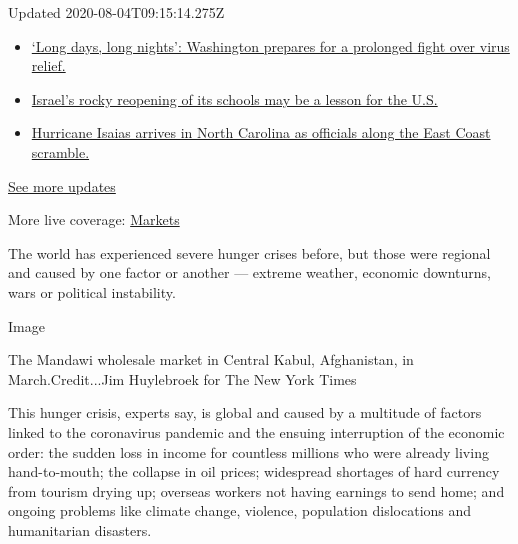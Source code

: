 Updated 2020-08-04T09:15:14.275Z

\begin{itemize}
\tightlist
\item
  \href{https://www.nytimes.com/2020/08/04/world/coronavirus-covid-19.html?action=click\&pgtype=Article\&state=default\&region=MAIN_CONTENT_1\&context=storylines_live_updates\#link-6b644638}{`Long
  days, long nights': Washington prepares for a prolonged fight over
  virus relief.}
\item
  \href{https://www.nytimes.com/2020/08/04/world/coronavirus-covid-19.html?action=click\&pgtype=Article\&state=default\&region=MAIN_CONTENT_1\&context=storylines_live_updates\#link-7af9fca0}{Israel's
  rocky reopening of its schools may be a lesson for the U.S.}
\item
  \href{https://www.nytimes.com/2020/08/04/world/coronavirus-covid-19.html?action=click\&pgtype=Article\&state=default\&region=MAIN_CONTENT_1\&context=storylines_live_updates\#link-33bf9168}{Hurricane
  Isaias arrives in North Carolina as officials along the East Coast
  scramble.}
\end{itemize}

\href{https://www.nytimes.com/2020/08/04/world/coronavirus-covid-19.html?action=click\&pgtype=Article\&state=default\&region=MAIN_CONTENT_1\&context=storylines_live_updates}{See
more updates}

More live coverage:
\href{https://www.nytimes.com/live/2020/08/03/business/stock-market-today-coronavirus?action=click\&pgtype=Article\&state=default\&region=MAIN_CONTENT_1\&context=storylines_live_updates}{Markets}

The world has experienced severe hunger crises before, but those were
regional and caused by one factor or another --- extreme weather,
economic downturns, wars or political instability.

Image

The Mandawi wholesale market in Central Kabul, Afghanistan, in
March.Credit...Jim Huylebroek for The New York Times

This hunger crisis, experts say, is global and caused by a multitude of
factors linked to the coronavirus pandemic and the ensuing interruption
of the economic order: the sudden loss in income for countless millions
who were already living hand-to-mouth; the collapse in oil prices;
widespread shortages of hard currency from tourism drying up; overseas
workers not having earnings to send home; and ongoing problems like
climate change, violence, population dislocations and humanitarian
disasters.

